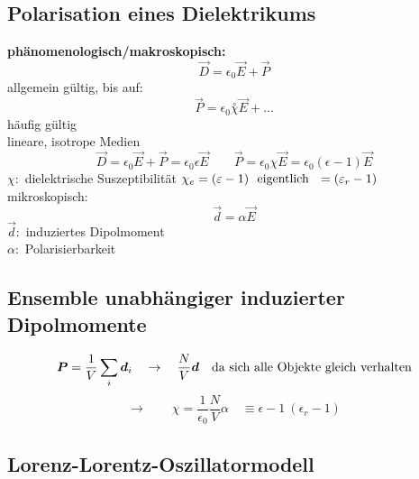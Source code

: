 \subsection{Polarisation eines Dielektrikums}

\textbf{phänomenologisch/makroskopisch:}
\begin{equation*}
\vec{D} = \epsilon_0 \vec{E} + \vec{P}
\end{equation*}
allgemein gültig, bis auf:
\begin{equation*}
\vec{P} = \epsilon_0 \overset{\circ}{\chi} \vec{E} + \dots
\end{equation*}
häufig gültig\\[5pt]
lineare, isotrope Medien
\begin{equation*}
\vec{D} = \epsilon_0 \vec{E} + \vec{P} = \epsilon_0 \epsilon \vec{E} \qquad \vec{P} = \epsilon_0 \chi \vec{E} = \epsilon_0 (\epsilon - 1) \vec{E}
\end{equation*}
$ \chi : $ dielektrische Suszeptibilität $ \chi_e = (\varepsilon - 1) \ \textrm{ eigentlich } \ = (\varepsilon_r - 1) $\\[5pt]
mikroskopisch:
\begin{equation*}
\vec{d} = \alpha \vec{E}
\end{equation*}
$ \vec{d} : $ induziertes Dipolmoment\\
$ \alpha : $ Polarisierbarkeit

\subsection{Ensemble unabhängiger induzierter Dipolmomente}

\begin{equation*}
\bm{P} = \frac{1}{V} \sum_i \bm{d}_i \quad \rightarrow \quad \frac{N}{V} \bm{d} \quad \textrm{da sich alle Objekte gleich verhalten}
\end{equation*}
\begin{equation*}
\rightarrow \qquad \chi = \frac{1}{\epsilon_0} \frac{N}{V} \alpha \quad \equiv \epsilon - 1 \ (\epsilon_r - 1)
\end{equation*}

\subsection{Lorenz-Lorentz-Oszillatormodell}

